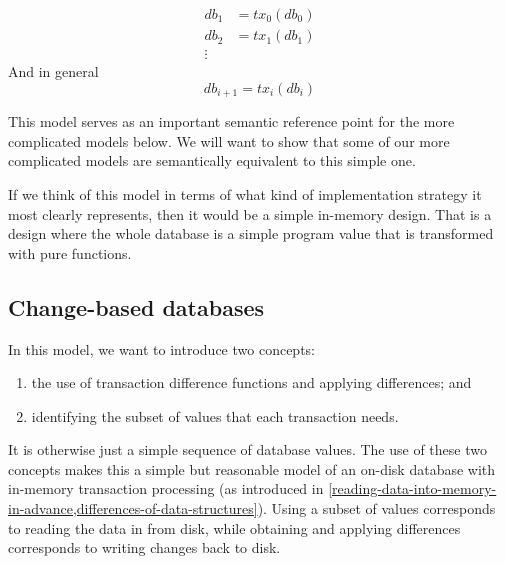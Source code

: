\documentclass[11pt,a4paper]{article}
\begin{document}
\begin{center}
\begin{align*}
  \mathit{db}_1 & = \mathit{tx}_0(\mathit{db}_0) \\
  \mathit{db}_2 & = \mathit{tx}_1(\mathit{db}_1) \\
  \vdots
\end{align*}
And in general
\begin{equation}
\label{eq:sequential-recurrence}
\mathit{db}_{i+1} = \mathit{tx}_i(\mathit{db}_i)
\end{equation}
\end{center}
This model serves as an important semantic reference point for the more
complicated models below. We will want to show that some of our more
complicated models are semantically equivalent to this simple one.

If we think of this model in terms of what kind of implementation strategy it
most clearly represents, then it would be a simple in-memory design. That is a
design where the whole database is a simple program value that is transformed
with pure functions.

\subsection{Change-based databases}
\label{change-based-databases}

In this model, we want to introduce two concepts:
\begin{enumerate}
\item the use of transaction difference functions and applying differences; and
\item identifying the subset of values that each transaction needs.
\end{enumerate}
It is otherwise just a simple sequence of database values. The use of these two
concepts makes this a simple but reasonable model of an on-disk database with
in-memory transaction processing (as introduced in
\cref{reading-data-into-memory-in-advance,differences-of-data-structures}).
Using a subset of values corresponds to reading the data in from disk, while
obtaining and applying differences corresponds to writing changes back to disk.
\end{document}
